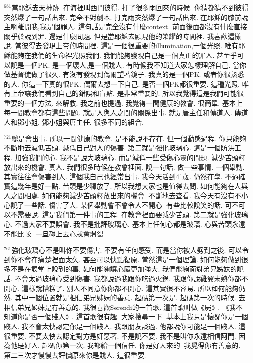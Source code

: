 \documentclass{book}
\begin{document}
$^{681}$當耶穌去天神跡.
在海裡叫西門彼得.
打了很多雨回來的時候.
你猜都猜不到彼得突然爆了一句話出來.
完全不對劇本.
打完雨突然爆了一句話出來.
在耶穌的膝前說主啊離開我,我是個罪人.
這句話是完全沒有什麼context.
前面後面都沒有什麼直接關乎於說到罪.
還是什麼問題.
但是當耶穌去顯現他的榮耀的時間裡.
我喜歡這樣說.
當彼得去發現上帝的時間裡.
這是一個很重要的illumination,一個光照.
唯有耶穌能夠在我們的生命裡光照我們.
我們能夠發現自己是一個真正的罪人.
甚至乎可以說是一個PK.
是一個壞人,是一個賤人.
有時候我不知道大家怎樣理解自己.
當你做基督徒做了很久.
有沒有發現到偶爾望著鏡子.
我真的是一個PK.
或者你很熟悉的人.
你這一下真的很PK.
偶爾去想一下自己.
是否一個PK都很重要.
這種光照.
唯有上帝讓我們看到自己的錯誤和盲點.
是非常重要的.
所以我覺得這是我們可能很重要的一個方法.
來解救.
我之前也提過.
我覺得一間健康的教會.
很簡單.
基本上每一間教會都有這些問題.
就是人與人之間的關係出事.
就是唐主任和傳道人.
傳道人和鄧小姐.
鄧小姐與唐主任.
很多不同的組合.

$^{721}$總是會出事.
所以一間健康的教會.
是不能說不存在.
但一個動態過程.
你只能夠不斷地去減低苦頭.
減低自己對人的傷害.
第二就是強化玻璃心.
這是一個防洪工程.
加強我們的心.
我不是說大玻璃心.
而是減低一些受傷心靈的問題.
減少苦頭釋放出來的機會.
真人.
我們很多時候在教會裡面.
說一句話.
做一些事情.
一個舉動.
其實往往會傷害到人.
這個我自己也經常出事.
我今天活到41歲.
仍然在學.
不過確實這幾年是好一點.
苦頭是少釋放了.
所以我想大家也是值得去問.
如何能夠在人與人之間相處.
如何能夠減少苦頭釋放出來的機會.
不斷地去查看.
我今天有沒有不小心說了一些話.
傷害了人.
某個舉動會不會令人不開心.
有些比較說笑的話.
可不可以不需要說.
這是我們第一件事的工程.
在教會裡面要減少苦頭.
第二就是強化玻璃心.
不過大家不要誤會.
我不是批評玻璃心.
基本上任何心都是玻璃.
心與苦頭永遠不能比較.
一旦碰上去心就會爆裂.

$^{761}$強化玻璃心不是叫你不要傷害.
不要有任何感受.
而是當你被人劈到之後.
可以令到你不會在痛楚裡面太久.
甚至可以快點復原.
當然這是一個理論.
如何能夠做到很多不是在課堂上說到的事.
如何能夠讓心臟更加強大.
我們能夠面對弟兄姊妹的說話.
不會太過玻璃心受到傷害.
我都說過我跟你吃過火鍋.
我跟你說雞翼未熟你都不開心.
這樣就糟糕了.
別人不同意你你都不開心.
這其實很不容易.
所以如何能夠仍然.
其中一個位置就是相信弟兄姊妹的善意.
起碼第一次是.
起碼第一次的時候.
去相信弟兄姊妹是有善意的.
我很喜歡Serendi的一首歌.
這首歌叫做《屍》.
《我不知道你是否一個賤人》.
這首歌很有趣.
大家搜尋一下.
基本上我只是懷疑你是一個賤人.
我不會太快認定你是一個賤人.
我跟朋友談過.
他都說你可能是一個賤人.
這很重要.
不要太快去認定對方是奸惡著.
不是說不要.
我不是叫你永遠相信阿門.
因為他是好人.
起碼你第一次.
我都給一個信任.
你是好人來的.
我覺得你有善意的.
第二三次才慢慢去評價原來你是賤人.
這很重要.
\end{document}
